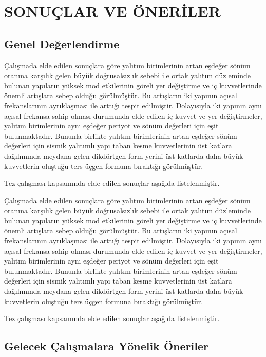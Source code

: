 
\chapter{SONUÇLAR VE ÖNERİLER}

\section{Genel Değerlendirme}

Çalışmada elde edilen sonuçlara göre yalıtım birimlerinin artan eşdeğer
sönüm oranına karşılık gelen büyük doğrusalsızlık sebebi ile ortak
yalıtım düzleminde bulunan yapıların yüksek mod etkilerinin göreli
yer değiştirme ve iç kuvvetlerinde önemli artışlara sebep olduğu görülmüştür.
Bu artışların iki yapının açısal frekanslarının ayrıklaşması ile arttığı
tespit edilmiştir. Dolayısıyla iki yapının aynı açısal frekansa sahip
olması durumunda elde edilen iç kuvvet ve yer değiştirmeler, yalıtım
birimlerinin aynı eşdeğer periyot ve sönüm değerleri için eşit bulunmaktadır.
Bununla birlikte yalıtım birimlerinin artan eşdeğer sönüm değerleri
için sismik yalıtımlı yapı taban kesme kuvvetlerinin üst katlara dağılımında
meydana gelen dikdörtgen form yerini üst katlarda daha büyük kuvvetlerin
oluştuğu ters üçgen formuna bıraktığı görülmüştür.

Tez çalışması kapsamında elde edilen sonuçlar aşağıda listelenmiştir. 

Çalışmada elde edilen sonuçlara göre yalıtım birimlerinin artan eşdeğer
sönüm oranına karşılık gelen büyük doğrusalsızlık sebebi ile ortak
yalıtım düzleminde bulunan yapıların yüksek mod etkilerinin göreli
yer değiştirme ve iç kuvvetlerinde önemli artışlara sebep olduğu görülmüştür.
Bu artışların iki yapının açısal frekanslarının ayrıklaşması ile arttığı
tespit edilmiştir. Dolayısıyla iki yapının aynı açısal frekansa sahip
olması durumunda elde edilen iç kuvvet ve yer değiştirmeler, yalıtım
birimlerinin aynı eşdeğer periyot ve sönüm değerleri için eşit bulunmaktadır.
Bununla birlikte yalıtım birimlerinin artan eşdeğer sönüm değerleri
için sismik yalıtımlı yapı taban kesme kuvvetlerinin üst katlara dağılımında
meydana gelen dikdörtgen form yerini üst katlarda daha büyük kuvvetlerin
oluştuğu ters üçgen formuna bıraktığı görülmüştür.

Tez çalışması kapsamında elde edilen sonuçlar aşağıda listelenmiştir. 

\section{Gelecek Çalışmalara Yönelik Öneriler}

